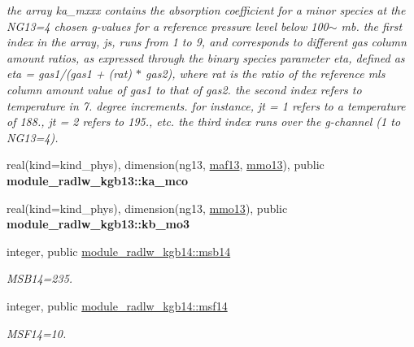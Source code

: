 \begin{DoxyCompactItemize}
\begin{DoxyCompactList}\small\item\em the array ka\+\_\+mxxx contains the absorption coefficient for a minor species at the N\+G13=4 chosen g-\/values for a reference pressure level below 100$\sim$ mb. the first index in the array, js, runs from 1 to 9, and corresponds to different gas column amount ratios, as expressed through the binary species parameter eta, defined as eta = gas1/(gas1 + (rat) $\ast$ gas2), where rat is the ratio of the reference mls column amount value of gas1 to that of gas2. the second index refers to temperature in 7. degree increments. for instance, jt = 1 refers to a temperature of 188., jt = 2 refers to 195., etc. the third index runs over the g-\/channel (1 to N\+G13=4). \end{DoxyCompactList}\item 
\mbox{\label{group__module__radlw__kgbnn_ga0c2f5802f9471c35759cb673dbc8ca05}} 
real(kind=kind\+\_\+phys), dimension(ng13, \hyperlink{group__module__radlw__kgbnn_ga1ddc025df872b12194b8c6344cc0204e}{maf13}, \hyperlink{group__module__radlw__kgbnn_gae513ce55829a57a0dbda77f570e4a619}{mmo13}), public {\bfseries module\+\_\+radlw\+\_\+kgb13\+::ka\+\_\+mco}
\item 
\mbox{\label{group__module__radlw__kgbnn_gacc93fbdd9ce1062cbe9b01973d8ab229}} 
real(kind=kind\+\_\+phys), dimension(ng13, \hyperlink{group__module__radlw__kgbnn_gae513ce55829a57a0dbda77f570e4a619}{mmo13}), public {\bfseries module\+\_\+radlw\+\_\+kgb13\+::kb\+\_\+mo3}
\item 
\mbox{\label{group__module__radlw__kgbnn_ga2d400a2aa969f2b2b6efd15555b67159}} 
integer, public \hyperlink{group__module__radlw__kgbnn_ga2d400a2aa969f2b2b6efd15555b67159}{module\+\_\+radlw\+\_\+kgb14\+::msb14}
\begin{DoxyCompactList}\small\item\em M\+S\+B14=235. \end{DoxyCompactList}\item 
\mbox{\label{group__module__radlw__kgbnn_ga37c15d52e45cd6b36dc246a059b0c5ca}} 
integer, public \hyperlink{group__module__radlw__kgbnn_ga37c15d52e45cd6b36dc246a059b0c5ca}{module\+\_\+radlw\+\_\+kgb14\+::msf14}
\begin{DoxyCompactList}\small\item\em M\+S\+F14=10. \end{DoxyCompactList}\item 

\end{DoxyCompactItemize}
